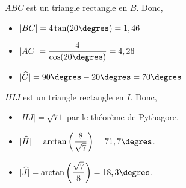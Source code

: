 %
%
    \begin{tasks}
        \task
        $ABC$ est un triangle rectangle en $B$. Donc,
        \begin{itemize}
            \item $|BC| = 4\tan(20\degres) = 1,46$
            \item $|AC| = \dfrac{4}{\cos(20\degres)} = 4,26$
            \item $|\widehat{C}| = 90\degres- 20\degres = 70\degres$
        \end{itemize}
        \task
        $HIJ$ est un triangle rectangle en $I$. Donc,
        \begin{itemize}
            \item $|HJ| = \sqrt{71}$ par le théorème de Pythagore.
            \item $|\widehat{H}| = \arctan\left(\dfrac{8}{\sqrt{7}}\right)=71,7\degres$.
            \item $|\widehat{J}| = \arctan\left(\dfrac{\sqrt{7}}{8}\right)=18,3\degres$.
        \end{itemize}
    \end{tasks}

